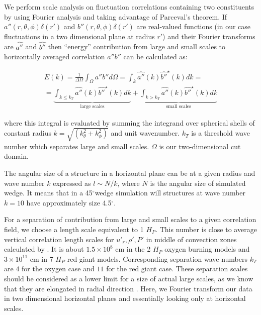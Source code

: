 \documentclass[10pt,paper=a4]{report}
\newcommand{\dgr}{\mbox{$^\circ$}}           %
\begin{document}
We perform scale analysis on fluctuation correlations containing two constituents by using Fourier analysis and taking advantage of Parceval's theorem. If $a''(r,\theta,\phi)\delta(r')$ and $b''(r,\theta,\phi)\delta(r')$ are real-valued functions (in our case fluctuations in a two dimensional plane at radius $r'$) and their Fourier transforms are $\widehat{a''}$ and $\widehat{b''}$ then ``energy'' contribution from large and small scales to horizontally averaged correlation $a''b''$ can be calculated as:

\begin{align}
E(k) =  \frac{1}{\Delta \Omega}\int_\Omega a'' b'' d\Omega = \int_k \widehat{a''}(k)\widehat{b''}^{\star}(k) dk = \nonumber \\
= \underbrace{\int_{k \le k_T} \widehat{a''}(k)\widehat{b''}^{\star}(k) dk}_\text{large scales} + \underbrace{\int_{k > k_T} \widehat{a''}(k)\widehat{b''}^{\star}(k) dk}_\text{small scales}
\label{eq:fourier_e}
\end{align}

where this integral is evaluated by summing the integrand over spherical shells of constant radius $k = \sqrt{(k_\theta^2 + k_\phi^2)}$ and unit wavenumber. $k_T$ is a threshold wave number which separates large and small scales. $\Omega$ is our two-dimensional cut domain.

The angular size of a structure in a horizontal plane can be at a given radius and wave number $k$ expressed as $l \sim N / k$, where $N$ is the angular size of simulated wedge. It means that in a 45\dgr wedge simulation will structures at wave number $k = 10$ have approximately size 4.5\dgr.

For a separation of contribution from large and small scales to a given correlation field, we choose a length scale equivalent to 1 $H_P$. This number is close to average vertical correlation length scales for $u'_r,\rho',P'$ in middle of convection zones calculated by \citet{VialletMeakin2013}. It is about $1.5 \times 10^8$ cm in the 2 $H_P$ oxygen burning models and $3 \times 10^{11}$ cm in 7 $H_P$ red giant models. Corresponding separation wave numbers $k_T$ are $4$ for the oxygen case and $11$ for the red giant case. These separation scales should be considered as a lower limit for a size of actual large scales, as we know that they are elongated in radial direction \citep{MeakinArnett2007}. Here, we Fourier transform our data in two dimensional horizontal planes and essentially looking only at horizontal scales. 

\end{document}

